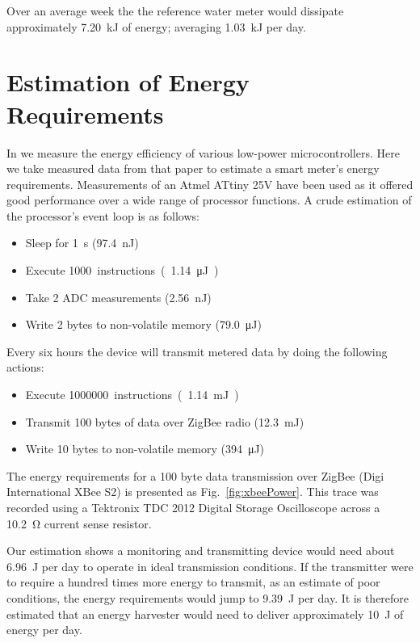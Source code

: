 \documentclass[10pt,final,journal]{IEEEtran}
\begin{document}
    Over an average week the the reference water meter would dissipate approximately \SI{7.20}{\kilo\joule} of energy; averaging \SI{1.03}{\kilo\joule} per day.

    \section{Estimation of Energy Requirements}
    \label{sect:powerRequirements}
    In \cite{Jones2011} we measure the energy efficiency of various low-power microcontrollers.
    Here we take measured data from that paper to estimate a smart meter's energy requirements.
    Measurements of an Atmel ATtiny 25V have been used as it offered good performance over a wide range of processor functions.
    A crude estimation of the processor's event loop is as follows:
    \begin{itemize}
    \item Sleep for \SI{1}{\second} (\SI{97.4}{\nano\joule})
    \item Execute \SI{1000} instructions (\SI{1.14}{\micro\joule})
    \item Take 2 ADC measurements (\SI{2.56}{\nano\joule})
    \item Write 2 bytes to non-volatile memory (\SI{79.0}{\micro\joule})
    \end{itemize}
    Every six hours the device will transmit metered data by doing the following actions:
    \begin{itemize}
    \item Execute \SI{1000000} instructions (\SI{1.14}{\milli\joule})
    \item Transmit 100 bytes of data over ZigBee radio (\SI{12.3}{\milli\joule})
    \item Write 10 bytes to non-volatile memory (\SI{394}{\micro\joule})
    \end{itemize}

    The energy requirements for a 100 byte data transmission over ZigBee (Digi International XBee S2) is presented as Fig.~\ref{fig:xbeePower}.
    This trace was recorded using a Tektronix TDC 2012 Digital Storage Oscilloscope across a \SI{10.2}{\ohm} current sense resistor.

    Our estimation shows a monitoring and transmitting device would need about \SI{6.96}{\joule} per day to operate in ideal transmission conditions.
    If the transmitter were to require a hundred times more energy to transmit, as an estimate of poor conditions, the energy requirements would jump to \SI{9.39}{\joule} per day.
    It is therefore estimated that an energy harvester would need to deliver approximately \SI{10}{\joule} of energy per day.
\end{document}
